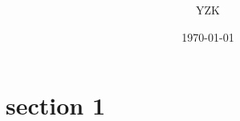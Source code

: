 \documentclass[UTF8]{ctexart}
\title{ }
\author{YZK}
\date{\today}
\begin{document}
\maketitle


\section{section 1}
\end{document}

